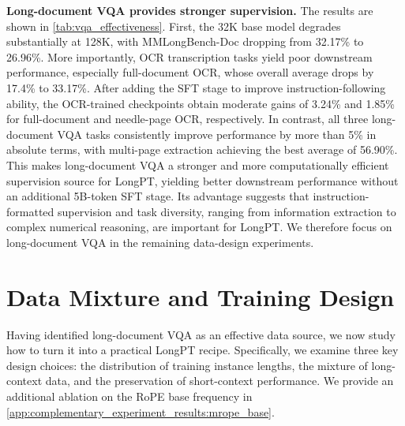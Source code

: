 \documentclass{llmxive}
\begin{document}
{\begin{table}[t]
\caption{We compare long-document VQA data with OCR transcription data under the same setting. The models are evaluated on the document category of MMLongBench~\citep{wang2025mmlongbench} at 64K and 128K, which contains three datasets: MMLongBench-Doc~\citep{ma2024mmlongbenchdoc}, LongDocURL~\citep{deng2025longdocurl}, and SlideVQA~\citep{tanaka2023slidevqa}. We abbreviate them as MMLB-D, LD-URL, and SLIDE, respectively. \textbf{SFT} means an extra 5B-token SFT stage.}
\label{tab:vqa_effectiveness}
\end{table}

\noindent\textbf{Long-document VQA provides stronger supervision.}
The results are shown in \cref{tab:vqa_effectiveness}.
First, the 32K base model degrades substantially at 128K, with MMLongBench-Doc dropping from 32.17\% to 26.96\%.
More importantly, OCR transcription tasks yield poor downstream performance, especially full-document OCR, whose overall average drops by 17.4\% to 33.17\%.
After adding the SFT stage to improve instruction-following ability, the OCR-trained checkpoints obtain moderate gains of 3.24\% and 1.85\% for full-document and needle-page OCR, respectively.
In contrast, all three long-document VQA tasks consistently improve performance by more than 5\% in absolute terms, with multi-page extraction achieving the best average of 56.90\%.
This makes long-document VQA a stronger and more computationally efficient supervision source for LongPT, yielding better downstream performance without an additional 5B-token SFT stage.
Its advantage suggests that instruction-formatted supervision and task diversity, ranging from information extraction to complex numerical reasoning, are important for LongPT.
We therefore focus on long-document VQA in the remaining data-design experiments.





\section{Data Mixture and Training Design}
\label{sec:mixing}
Having identified long-document VQA as an effective data source, we now study how to turn it into a practical LongPT recipe.
Specifically, we examine three key design choices: the distribution of training instance lengths, the mixture of long-context data, and the preservation of short-context performance.
We provide an additional ablation on the RoPE base frequency in \cref{app:complementary_experiment_results:mrope_base}.


}
\end{document}
